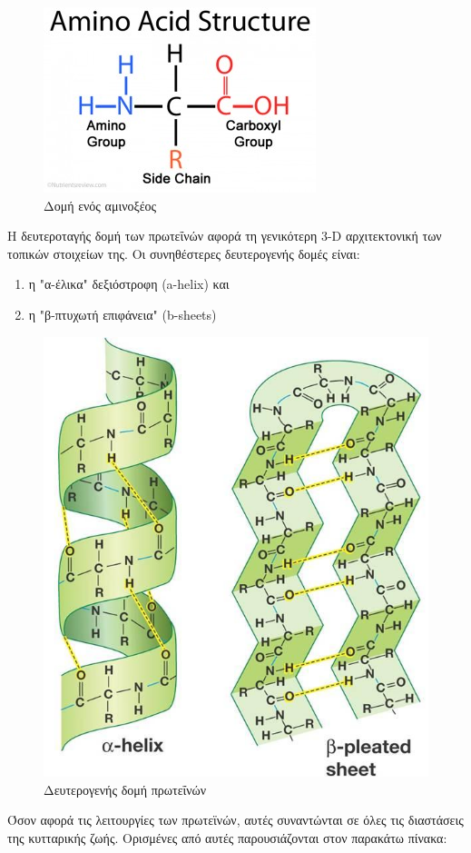 \begin{figure}[h]
  \centering
  \includegraphics[scale=0.75]{images/AAS.jpg}
  \caption{Δομή ενός αμινοξέος}
  \label{fig:AAS}
\end{figure}


Η δευτεροταγής δομή των πρωτεΐνών αφορά τη γενικότερη 3-D αρχιτεκτονική των τοπικών στοιχείων της. Οι συνηθέστερες δευτερογενής δομές είναι:
\begin{enumerate}
    \item η "α-έλικα" δεξιόστροφη (a-helix) και
    \item η "β-πτυχωτή επιφάνεια" (b-sheets)
\end{enumerate}

\begin{figure}[h]
  \centering
  \includegraphics[scale=0.35]{images/sec_str.jpg}
  \caption{Δευτερογενής δομή πρωτεΐνών}
  \label{fig:sec_str}
\end{figure}
Όσον αφορά τις λειτουργίες των πρωτεϊνών, αυτές συναντώνται σε όλες τις διαστάσεις της κυτταρικής ζωής. Ορισμένες από αυτές παρουσιάζονται στον παρακάτω πίνακα:


